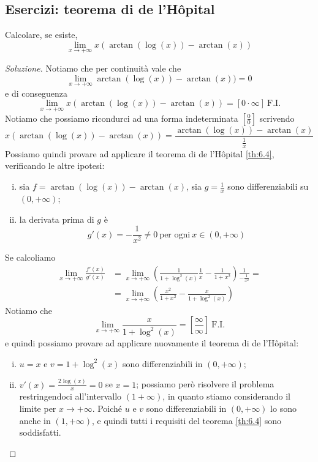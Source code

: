 \subsection{Esercizi: teorema di de \texorpdfstring{l'H{\^o}pital}{l'Hôpital}}
\begin{exercise}
    \label{ex:6.3}
    Calcolare, se esiste,
    \[
    \lim_{x\to +\infty} x\left(\arctan(\log(x))-\arctan(x)\right)
    \]
\end{exercise}
\begin{proof}[Soluzione]
    Notiamo che per continuità vale che
    \[
    \lim_{x\to+\infty} \arctan(\log(x))-\arctan(x)) = 0
    \]
    e di conseguenza 
    \[
    \lim_{x\to +\infty} x\left(\arctan(\log(x))-\arctan(x)\right) = [0\cdot \infty] \ \text{F.I.}
    \]
    Notiamo che possiamo ricondurci ad una forma indeterminata $[\frac{0}{0}]$ scrivendo
    \[
    x\left(\arctan(\log(x))-\arctan(x)\right)  = \frac{\arctan(\log(x))-\arctan(x)}{\frac{1}{x}}
    \]
    Possiamo quindi provare ad applicare il teorema di de l'H{\^o}pital \ref{th:6.4}, verificando le altre ipotesi:
    \begin{enumerate}[(i)]
        \item sia $f=\arctan(\log(x))-\arctan(x)$, sia $g=\frac{1}{x}$ sono differenziabili su $(0, +\infty)$;
        \item la derivata prima di $g$ è
        \[
        g'(x) = -\frac{1}{x^2}\ne 0 \ \text{per ogni} \ x\in(0,+\infty)
        \]
    \end{enumerate}
    Se calcoliamo 
    \[
    \begin{split}
        \lim_{x\to +\infty} \frac{f'(x)}{g'(x)} & = \lim_{x\to +\infty}\left(\frac{1}{1+\log^2(x)}\frac{1}{x}-\frac{1}{1+x^2}\right)\frac{1}{-\frac{1}{x^2}} = \\
        & = \lim_{x\to+\infty} \left(\frac{x^2}{1+x^2}-\frac{x}{1+\log^2(x)}\right)
    \end{split}
    \]
    Notiamo che
    \[
    \lim_{x\to +\infty} \frac{x}{1+\log^2(x)} = \left[\frac{\infty}{\infty}\right] \ \text{F.I.}
    \]
    e quindi possiamo provare ad applicare nuovamente il teorema di de l'H{\^o}pital: 
    \begin{enumerate}[(i)]
        \item $u=x$ e $v=1+\log^2(x)$ sono differenziabili in $(0,+\infty)$;
        \item $v'(x) = \frac{2\log(x)}{x}= 0$ se $x=1$; possiamo però risolvere il problema restringendoci all'intervallo $(1+\infty)$, in quanto stiamo considerando il limite per $x\to+\infty$. Poiché $u$ e $v$ sono differenziabili in $(0,+\infty)$ lo sono anche in $(1, +\infty)$, e quindi tutti i requisiti del teorema \ref{th:6.4} sono soddisfatti.

\end{enumerate}
\end{proof}
